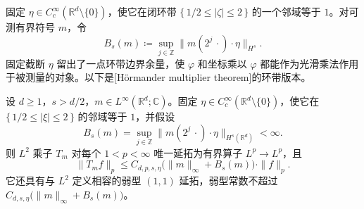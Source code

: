 固定 \(\eta\in C_c^\infty(\mathbb R^d\setminus\{0\})\)，使它在闭环带 \(\{\,1/2\leq|\zeta|\leq2\,\}\) 的一个邻域等于 \(1\)。对可测有界符号 \(m\)，令
\[
 B_s(m)\coloneqq\sup_{j\in\mathbb Z}
 \|m(2^j\,\cdot)\cdot\eta\|_{H^s}.
\]
固定截断 \(\eta\) 留出了一点环带边界余量，使 \(\varphi\) 和坐标乘以 \(\varphi\) 都能作为光滑乘法作用于被测量的对象。以下是[Hörmander multiplier theorem]的环带版本。

\begin{theorem}\label{b2:thm:22-hormander}
设 \(d\geq1\)，\(s>d/2\)，\(m\in L^\infty(\mathbb R^d;\mathbb C)\)。固定 \(\eta\in C_c^\infty(\mathbb R^d\setminus\{0\})\)，使它在 \(\{\,1/2\leq|\xi|\leq2\,\}\) 的邻域等于 \(1\)，并假设
\[
 B_s(m)=\sup_{j\in\mathbb Z}
 \|m(2^j\,\cdot)\cdot\eta\|_{H^s(\mathbb R^d)}<\infty.
\]
则 \(L^2\) 乘子 \(T_m\) 对每个 \(1<p<\infty\) 唯一延拓为有界算子 \(L^p\to L^p\)，且
\[
 \|T_mf\|_p\leq C_{d,p,s,\eta}
 \bigl(\|m\|_\infty+B_s(m)\bigr)\cdot\|f\|_p.
\]
它还具有与 \(L^2\) 定义相容的弱型 \((1,1)\) 延拓，弱型常数不超过
\(C_{d,s,\eta}\bigl(\|m\|_\infty+B_s(m)\bigr)\)。
\end{theorem}
